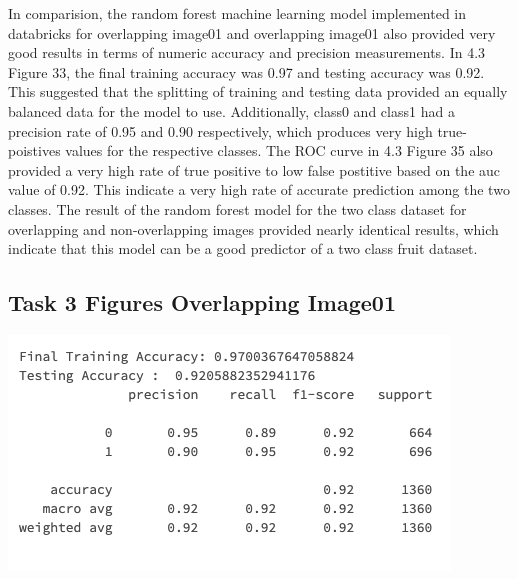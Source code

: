 \documentclass[12pt]{article}
\begin{document}
\begin{multicols*}{2}
  \hspace*{5mm} In comparision, the random forest machine learning model implemented in databricks for overlapping image01 and overlapping image01 also provided very good results in terms of numeric
  accuracy and precision measurements. In 4.3 Figure 33, the final training accuracy was 0.97 and testing accuracy was 0.92. This suggested that the splitting of training and testing data provided an equally
  balanced data for the model to use. Additionally, class0 and class1 had a precision rate of 0.95 and 0.90 respectively, which produces very high true-poistives values for the respective classes. 
  The ROC curve in 4.3 Figure 35 also provided a very high rate of true positive to low false postitive based on the auc value of 0.92. This indicate a very high rate of accurate prediction among 
  the two classes. The result of the random forest model for the two class dataset for overlapping and non-overlapping images provided nearly identical results, which indicate that this model can be a 
  good predictor of a two class fruit dataset.

  \subsection{Task 3 Figures Overlapping Image01}
  \begin{center}
	\includegraphics[scale=0.4]{../screenshot/Overlapping/score01.png}


\end{center}
\end{multicols*}
\end{document}
